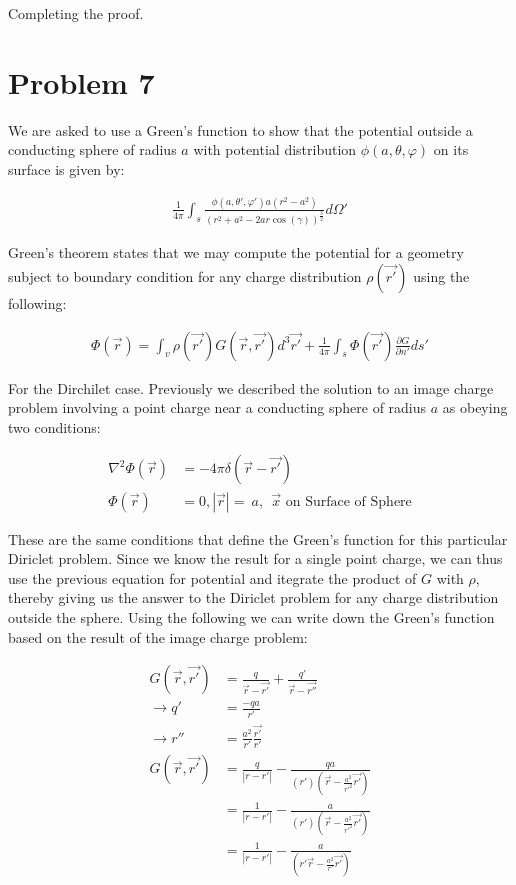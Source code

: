 \documentclass[paper=a4, fontsize=11pt]{scrartcl} %
\newcommand{\scrr}{\vec{r} - \vec{r'}}
\numberwithin{equation}{section} %
\numberwithin{figure}{section} %
\numberwithin{table}{section} %
\begin{document}
Completing the proof.

\section{Problem 7}
We are asked to use a Green's function to show that the potential outside a conducting sphere of radius $a$ with potential distribution $\phi(a, \theta, \varphi)$ on its surface is given by:

\begin{align}
\frac{1}{4 \pi}\int_s \frac{\phi(a, \theta', \varphi') a (r^2 - a^2)}{\left(r^2 + a^2 - 2 a r \cos(\gamma)\right)^\frac{3}{2}} d\Omega'
\end{align}

Green's theorem states that we may compute the potential for a geometry subject to boundary condition for any charge distribution $\rho(\vec{r'})$ using the following:

\begin{align}
\Phi(\vec{r}) = \int_v \rho(\vec{r'})G(\vec{r},\vec{r'})d^3\vec{r'} + \frac{1}{4 \pi} \int_s \Phi(\vec{r'})\frac{\partial G}{\partial n'} ds'
\end{align}

For the Dirchilet case. Previously we described the solution to an image charge problem involving a point charge near a conducting sphere of radius $a$ as obeying two conditions:

\begin{align}
\nabla^2 \Phi(\vec{r}) &= -4 \pi \delta(\scrr) \\
\Phi(\vec{r}) &= 0, |\vec{r}| = \  a, \ \ \text{$\vec{x}$ on Surface of Sphere}
\end{align} 

These are the same conditions that define the Green's function for this particular Diriclet problem. Since we know the result for a single point charge, we can thus use the previous equation for potential and itegrate the product of $G$ with $\rho$, thereby giving us the answer to the Diriclet problem for any charge distribution outside the sphere. Using the following we can write down the Green's function based on the result of the image charge problem:

\begin{align}
G(\vec{r}, \vec{r'}) &= \frac{q}{\scrr} + \frac{q'}{\vec{r} - \vec{r''}} \\ 
\rightarrow  q' &= \frac{-q a}{r'} \\
\rightarrow r'' &= \frac{a^2}{r'}\frac{\vec{r'}}{r'} \\
G(\vec{r}, \vec{r'}) &= \frac{q}{|r - r'|} - \frac{qa}{\left(r'\right)\left(\vec{r} - \frac{a^2}{r'^2}\vec{r'}\right)}\\
&= \frac{1}{|r - r'|} - \frac{a}{\left(r'\right)\left(\vec{r} - \frac{a^2}{r'^2}\vec{r'}\right)} \\ 
&= \frac{1}{|r - r'|} - \frac{a}{\left(r'\vec{r} - \frac{a^2}{r'}\vec{r'}\right)}
\end{align}
\end{document}
